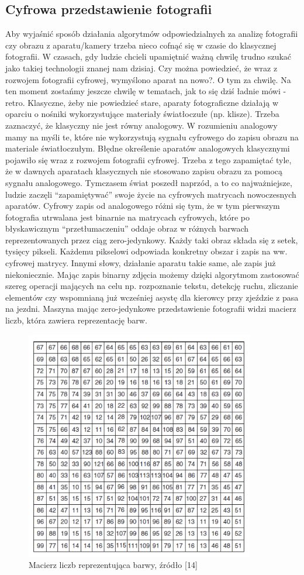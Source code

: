 \documentclass{article}
\begin{document}
	\subsection{Cyfrowa przedstawienie fotografii}
	Aby wyjaśnić sposób działania algorytmów odpowiedzialnych za analizę fotografii czy obrazu z aparatu/kamery trzeba nieco cofnąć się w czasie do klasycznej fotografii.
	W czasach, gdy ludzie chcieli upamiętnić ważną chwilę trudno szukać jako takiej technologii znanej nam dzisiaj. Czy można powiedzieć, że wraz z rozwojem fotografii cyfrowej, wymyślono aparat na nowo?. O tym za chwilę. Na ten moment zostańmy jeszcze chwilę w tematach, jak to się dziś ładnie mówi - retro. Klasyczne, żeby nie powiedzieć stare, aparaty fotograficzne działają w oparciu o nośniki wykorzystujące materiały światłoczułe (np. klisze). Trzeba zaznaczyć, że klasyczny nie jest równy analogowy. W rozumieniu analogowy mamy na myśli te, które nie wykorzystują sygnału cyfrowego do zapisu obrazu na materiale światłoczułym. Błędne określenie aparatów analogowych klasycznymi pojawiło się wraz z rozwojem fotografii cyfrowej. Trzeba z tego zapamiętać tyle, że w dawnych aparatach klasycznych nie stosowano zapisu obrazu za pomocą sygnału analogowego. Tymczasem świat poszedł naprzód, a to co najważniejsze, ludzie zaczęli “zapamiętywać” swoje życie na cyfrowych matrycach nowoczesnych aparatów. Cyfrowy zapis od analogowego różni się tym, że w tym pierwszym fotografia utrwalana jest binarnie na matrycach cyfrowych, które po błyskawicznym “przetłumaczeniu” oddaje obraz w różnych barwach reprezentowanych przez ciąg zero-jedynkowy. Każdy taki obraz składa się z setek, tysięcy pikseli. Każdemu pikselowi odpowiada konkretny obszar i zapis na ww. cyfrowej matrycy. Innymi słowy, działanie aparatu takie same, ale zapis już niekoniecznie. Mając zapis binarny zdjęcia możemy dzięki algorytmom zastosować szereg operacji mających na celu np. rozpoznanie tekstu, detekcję ruchu, zliczanie elementów czy wspomnianą już wcześniej asystę dla kierowcy przy zjeździe z pasa na jezdni. Maszyna mając zero-jedynkowe przedstawienie fotografii widzi macierz liczb, która zawiera reprezentację barw.
	\begin{figure}
		\centering
		\includegraphics[width=10cm]{macierz}
		\caption{Macierz liczb reprezentująca barwy, źródło [14]}
	\end{figure}
\end{document}
